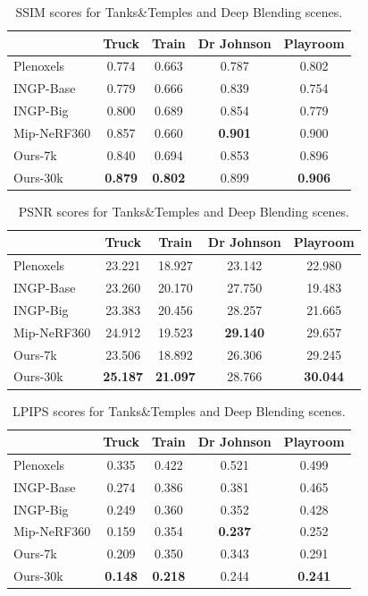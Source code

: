 \begin{appendix}
	\begin{table}[H]
	\caption{SSIM scores for Tanks\&Temples and Deep Blending scenes. }
		\centering
    \begin{tabular}{l|cc|cc}
	~ & Truck & Train & Dr Johnson & Playroom \\ \hline
	Plenoxels & 0.774 & 0.663 & 0.787 & 0.802 \\ 
	INGP-Base & 0.779 & 0.666 & 0.839 & 0.754 \\ 
	INGP-Big & 0.800 & 0.689 & 0.854 & 0.779 \\ 
	Mip-NeRF360 & 0.857 & 0.660 & \textbf{0.901} & 0.900 \\ 
	Ours-7k & 0.840 & 0.694 & 0.853 & 0.896 \\ 
	Ours-30k & \textbf{0.879} & \textbf{0.802} & 0.899 & \textbf{0.906} \\ 
\end{tabular}
\end{table}
	\begin{table}[H]
	\caption{PSNR scores for Tanks\&Temples and Deep Blending scenes. }
		\centering
		\begin{tabular}{l|cc|cc}
			~ & Truck  & Train & Dr Johnson & Playroom \\ \hline
			Plenoxels & 23.221 & 18.927 & 23.142 & 22.980 \\ 
			INGP-Base & 23.260  & 20.170 & 27.750 & 19.483 \\ 
			INGP-Big & 23.383  & 20.456 & 28.257 & 21.665 \\ 
			Mip-NeRF360 & 24.912  & 19.523 & \textbf{29.140} & 29.657 \\ 
			Ours-7k & 23.506  & 18.892 & 26.306 & 29.245 \\ 
			Ours-30k & \textbf{25.187} & \textbf{21.097} & 28.766 & \textbf{30.044} \\ 
		\end{tabular}
\end{table}
	

	\begin{table}[H]
	\caption{LPIPS scores for Tanks\&Temples and Deep Blending scenes. }
		\centering
    \begin{tabular}{l|cc|cc}
	~ & Truck & Train & Dr Johnson & Playroom \\ \hline
	Plenoxels & 0.335 & 0.422 & 0.521 & 0.499 \\ 
	INGP-Base & 0.274 & 0.386 & 0.381 & 0.465 \\ 
	INGP-Big & 0.249 & 0.360 & 0.352 & 0.428 \\ 
	Mip-NeRF360 & 0.159 & 0.354 & \textbf{0.237} & 0.252 \\ 
	Ours-7k & 0.209 & 0.350 & 0.343 & 0.291 \\ 
	Ours-30k & \textbf{0.148} & \textbf{0.218} & 0.244 & \textbf{0.241} \\ 
\end{tabular}
		\label{tab:ttdb_scene_lpips}
\end{table}
	
\end{appendix}
